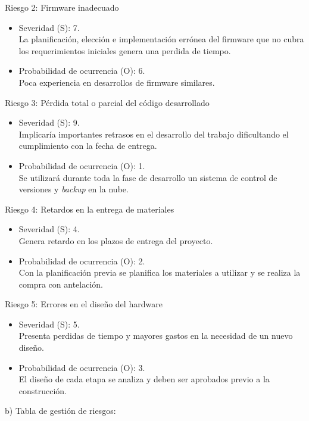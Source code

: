 \documentclass[11pt]{charter}
\begin{document}
Riesgo 2: Firmware inadecuado
\begin{itemize}
\item Severidad (S): 7.\\
La planificación, elección e implementación errónea del firmware que no cubra los requerimientos iniciales genera una perdida de tiempo.
\item Probabilidad de ocurrencia (O): 6.\\
Poca experiencia en desarrollos de firmware similares. 
\end{itemize}

Riesgo 3: Pérdida total o parcial del código desarrollado
\begin{itemize}
\item Severidad (S): 9.\\
Implicaría importantes retrasos en el desarrollo del trabajo dificultando el cumplimiento con la fecha de entrega.
\item Probabilidad de ocurrencia (O): 1.\\
Se utilizará durante toda la fase de desarrollo un sistema de control de versiones y \textit{backup} en la nube.
\end{itemize}

Riesgo 4: Retardos en la entrega de materiales
\begin{itemize}
\item Severidad (S): 4.\\
Genera retardo en los plazos de entrega del proyecto.
\item Probabilidad de ocurrencia (O): 2.\\
Con la planificación previa se planifica los materiales a utilizar y se realiza la compra con antelación. 
\end{itemize}

Riesgo 5: Errores en el diseño del hardware 
\begin{itemize}
\item Severidad (S): 5.\\
Presenta perdidas de tiempo y mayores gastos en la necesidad de un nuevo diseño.
\item Probabilidad de ocurrencia (O): 3.\\
El diseño de cada etapa se analiza y deben ser aprobados previo a la construcción. 
\end{itemize}

b) Tabla de gestión de riesgos:  
\end{document}
